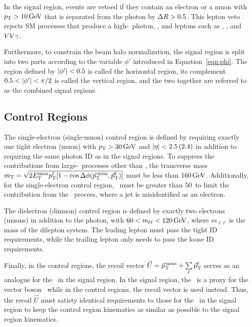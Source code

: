 In the signal region, events are vetoed if they contain an electron or a muon with $p_{\mathrm{T}} > 10\,\text{Ge\hspace{-.08em}V}$ that is separated from the photon by $\Delta R > 0.5$. This lepton veto rejects SM processes that produce a high-\pt\ photon, \met, and leptons such as \wlng, \ttg, and $VV\gamma$. %

Furthermore, to constrain the beam halo normalization, the signal region is split into two parts according to the variable $\phi'$ introduced in Equation~\ref{eqn:phi}. 
The region defined by $\lvert \phi' \rvert < 0.5$ is called the horizontal region, its complement $0.5 < \lvert \phi' \rvert < \pi/2$ is called the vertical region, and the two together are referred to as the combined signal regions.

\subsection{Control Regions}
\label{sec:control_regions}

The single-electron (single-muon) control region is defined by requiring exactly one tight electron (muon) with $p_{\mathrm{T}} > 30\,\text{Ge\hspace{-.08em}V}$ and $\lvert \eta \rvert < 2.5\,(2.4)$ in addition to requiring the same photon ID as in the signal regions.
To suppress the contributions from large-\met\ processes other than \wlng, the transverse mass $m_{\mathrm{T}} = \sqrt{\smash[b]{2E_{\mathrm{T}}^{\text{miss}}p_{\mathrm{T}}^{\ell}[1-\cos\Delta\phi({\vec p}_{\mathrm{T}}^{\kern2pt\text{miss}},{\vec p}_{\mathrm{T}}^{\ell})]}}$ must be less than $160\,\text{Ge\hspace{-.08em}V}$.
Additionally, for the single-electron control region, \met\ must be greater than 50\GeV\ to limit the contribution from the \gj\ process, where a jet is misidentified as an electron. %


The dielectron (dimuon) control region is defined by exactly two electrons (muons) in addition to the photon, with $60 < m_{\ell\ell} < 120\,\text{Ge\hspace{-.08em}V}$, where $m_{\ell\ell}$ is the mass of the dilepton system.
The leading lepton must pass the tight ID requirements, while the trailing lepton only needs to pass the loose ID requirements. 

Finally, in the control regions, the recoil vector $\vec{U} = {\vec p}_{\mathrm{T}}^{\kern2pt\text{miss}} + \sum\limits_\ell{\vec p}_{\mathrm{T}}^{\ell}$ serves as an analogue for the \ptvecmiss\ in the signal region.
In the signal region, the \ptvecmiss\ is a proxy for the vector boson \pt\ while in the control regions, the recoil vector is used instead. 
Thus, the recoil $\vec{U}$ must satisty identical requirements to those for the \ptvecmiss\ in the signal region to keep the control region kinematics as similar as possible to the signal region kinematics.

